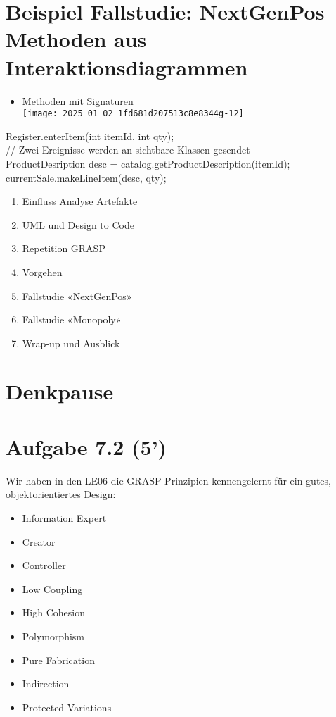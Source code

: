 \documentclass[10pt]{article}
\begin{document}
\section*{Beispiel Fallstudie: NextGenPos Methoden aus Interaktionsdiagrammen}
\begin{itemize}
  \item Methoden mit Signaturen\\
\texttt{[image: 2025\_01\_02\_1fd681d207513c8e8344g-12]}
\end{itemize}

Register.enterItem(int itemId, int qty);\\
// Zwei Ereignisse werden an sichtbare Klassen gesendet\\
ProductDesription desc = catalog.getProductDescription(itemId); currentSale.makeLineItem(desc, qty);

\begin{enumerate}
  \item Einfluss Analyse Artefakte
  \item UML und Design to Code
  \item Repetition GRASP
  \item Vorgehen
  \item Fallstudie «NextGenPos»
  \item Fallstudie «Monopoly»
  \item Wrap-up und Ausblick
\end{enumerate}

\section*{Denkpause}
\section*{Aufgabe 7.2 (5')}
Wir haben in den LE06 die GRASP Prinzipien kennengelernt für ein gutes, objektorientiertes Design:

\begin{itemize}
  \item Information Expert
  \item Creator
  \item Controller
  \item Low Coupling
  \item High Cohesion
  \item Polymorphism
  \item Pure Fabrication
  \item Indirection
  \item Protected Variations
\end{itemize}
\end{document}
